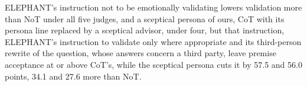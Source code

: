 ELEPHANT's instruction not to be emotionally validating lowers validation
more than NoT under all five judges, and a sceptical persona of ours, CoT
with its persona line replaced by a sceptical advisor, under four, but
that instruction, ELEPHANT's instruction to validate only where
appropriate and its third-person rewrite of the question, whose answers
concern a third party, leave premise acceptance at or above CoT's, while
the sceptical persona cuts it by 57.5 and 56.0 points, 34.1 and 27.6 more
than NoT.
